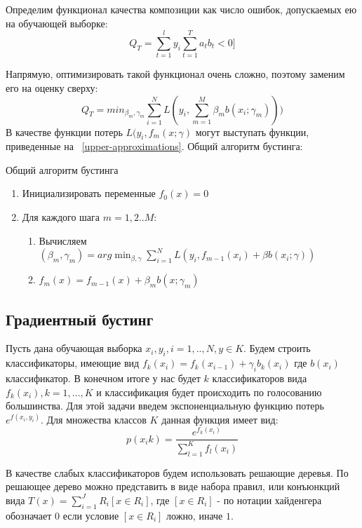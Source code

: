 Определим функционал качества композиции как число ошибок, допускаемых
ею на обучающей выборке:
\begin{equation}
	Q_T=\sum_{t=1}^{l} y_i\sum_{t=1}^{T} a_tb_t < 0]
\end{equation}

Напрямую, оптимизировать такой функционал очень сложно, поэтому заменим его на оценку сверху:
\begin{equation}
	Q_T=min_{\beta_m,\gamma_m}\sum_{i=1}^{N}L(y_i,\sum_{m=1}^{M}\beta_m b(x_i;\gamma_m)))
\end{equation}
В качестве функции потерь $L(y_i,f_m(x;\gamma)$ могут выступать функции, приведенные на ~\ref{upper-approximations}.
Общий алгоритм бустинга:

\begin{algorithm}
  \caption{Общий алгоритм бустинга}
  \label{overall-boosting-algorithm}
  \begin{enumerate}
  \item Инициализировать переменные $f_0(x)=0$
  \item Для каждого шага $m=1,2 .. M$:
    \begin{enumerate}
      \item Вычисляем $(\beta_m,\gamma_m)=arg \min_{\beta,\gamma} \sum_{i=1}^{N}L(y_i,f_{m-1}(x_i)+\beta b(x_i;\gamma))$
      \item $f_m(x)=f_{m-1}(x)+\beta_m b(x;\gamma_m)$
    \end{enumerate}
  \end{enumerate}
\end{algorithm}


\subsection{Градиентный бустинг}

Пусть дана обучающая выборка ${x_i,y_i}, i=1,..,N, y \in K$. Будем строить классификаторы, имеющие вид $f_k(x_i)=f_k(x_{i-1})+\gamma_i b_k(x_i)$ где $b(x_i) $ классификатор. В конечном итоге у нас будет $k$ классификаторов вида $f_k(x_i), k=1,...,K$ и классификация будет происходить по голосованию большинства. Для этой задачи введем экспоненциальную функцию потерь $e^{f(x_i,y_i)}$. Для множества классов $K$ данная функция имеет вид:
\begin{equation}
  p(x_ik)= \frac{e^{f_k(x_i)}}{\sum_{l=1}^{K}f_l(x_i)}
\end{equation}

В качестве слабых классификаторов будем использовать решающие деревья. По  решающее дерево можно представить в виде набора правил, или конъюнкций вида $T(x) = \sum_{i=1}^{J}R_i[x \in R_i]$, где $[x \in R_i]$ - по нотации хайденгера обозначает $0$ если условие $[x \in R_i]$ ложно, иначе $1$.

